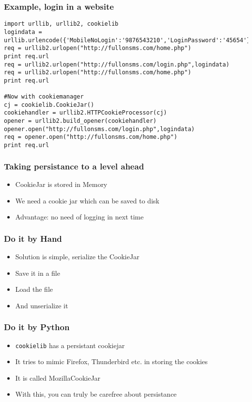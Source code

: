 \documentclass{beamer}
\begin{document}
\begin{frame}[fragile]
\frametitle{Example, login in a website}
\label{sec-9_16}

\begin{verbatim}
import urllib, urllib2, cookielib
logindata = urllib.urlencode({'MobileNoLogin':'9876543210','LoginPassword':'45654'})
req = urllib2.urlopen("http://fullonsms.com/home.php")
print req.url
req = urllib2.urlopen("http://fullonsms.com/login.php",logindata)
req = urllib2.urlopen("http://fullonsms.com/home.php")
print req.url

#Now with cookiemanager
cj = cookielib.CookieJar()
cookiehandler = urllib2.HTTPCookieProcessor(cj)
opener = urllib2.build_opener(cookiehandler)
opener.open("http://fullonsms.com/login.php",logindata)
req = opener.open("http://fullonsms.com/home.php")
print req.url
\end{verbatim}
\end{frame}
\begin{frame}
\frametitle{Taking persistance to a level ahead}
\label{sec-9_17}


\begin{itemize}
\item CookieJar is stored in Memory
\item We need a cookie jar which can be saved to disk
\item Advantage: no need of logging in next time
\end{itemize}
\end{frame}
\begin{frame}
\frametitle{Do it by Hand}
\label{sec-9_18}


\begin{itemize}
\item Solution is simple, serialize the CookieJar
\item Save it in a file
\item Load the file
\item And unserialize it
\end{itemize}
\end{frame}
\begin{frame}
\frametitle{Do it by Python}
\label{sec-9_19}


\begin{itemize}
\item \texttt{cookielib} has a persistant cookiejar
\item It tries to mimic Firefox, Thunderbird etc. in storing the cookies
\item It is called MozillaCookieJar
\item With this, you can truly be carefree about persistance
\end{itemize}
\end{frame}
\end{document}
